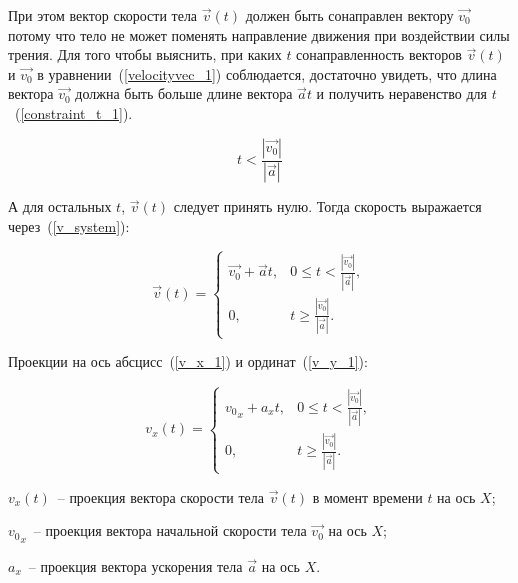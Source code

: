 При этом вектор скорости тела \(\vec{v}(t)\) должен быть сонаправлен вектору \(\vec{v_0}\)
потому что тело не может поменять направление движения при воздействии силы трения.
Для того чтобы выяснить, при каких \(t\) сонаправленность векторов \(\vec{v}(t)\) и \(\vec{v_0}\)
в уравнении~(\ref{velocityvec_1}) соблюдается,
достаточно увидеть, что длина вектора \(\vec{v_0}\) должна быть больше длине вектора \(\vec{a}t\)
и получить неравенство для \(t\)~(\ref{constraint_t_1}).


\newcommand\Constraintt{
  \frac{\left|\vec{v_0}\right|}{\left|\vec{a}\right|}
}

\newcommand\Constrainttle{
  t < \Constraintt
}

\newcommand\Constrainttge{
  t \geqslant \Constraintt
}

\begin{equation}\label{constraint_t_1}
  \Constrainttle
\end{equation}

А для остальных \(t\), \(\vec{v}(t)\) следует принять нулю. Тогда скорость выражается через~(\ref{v_system}):

\begin{equation}\label{v_system}
  \vec{v}(t) =
  \begin{cases}
    \vec{v_0} + \vec{a}t, & 0 \leqslant \Constrainttle, \\
    0,                    & \Constrainttge .
  \end{cases}
\end{equation}

Проекции на ось абсцисс~(\ref{v_x_1}) и ординат~(\ref{v_y_1}):

\begin{equation}\label{v_x_1}
  v_x(t) =
  \begin{cases}
    {v_0}_x + a_x t, & 0 \leqslant \Constrainttle, \\
    0,               & \Constrainttge.
  \end{cases}
\end{equation}

\begin{Underequation}
  \(v_x(t)\)~-- проекция вектора скорости тела \(\vec{v}(t)\) в момент времени \(t\) на ось \(X\);

  \({v_0}_x\)~-- проекция вектора начальной скорости тела \(\vec{v_0}\) на ось \(X\);

  \(a_x\)~-- проекция вектора ускорения тела \(\vec{a}\) на ось \(X\).
\end{Underequation}

